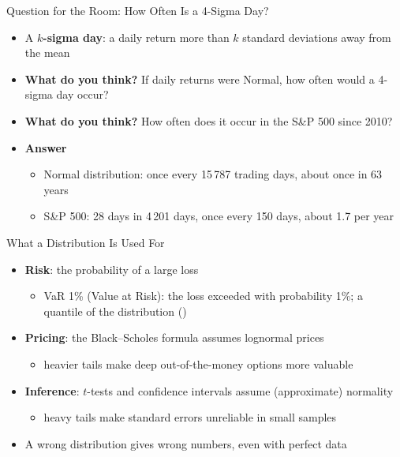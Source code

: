 \begin{frame}{Question for the Room: How Often Is a 4-Sigma Day?}
\itemsize{\small}
\begin{itemize}
    \item A \textbf{$k$-sigma day}: a daily return more than $k$ standard deviations away from the mean
    \item \textbf{What do you think?} If daily returns were Normal, how often would a 4-sigma day occur?
    \item \textbf{What do you think?} How often does it occur in the S\&P 500 since 2010?
    \item \textbf{Answer}
    \begin{itemize}
        \item Normal distribution: once every 15\,787 trading days, about once in 63 years
        \item S\&P 500: 28 days in 4\,201 days, once every 150 days, about 1.7 per year
    \end{itemize}
\end{itemize}
\end{frame}

\begin{frame}{What a Distribution Is Used For}
\itemsize{\small}
\begin{itemize}
    \item \textbf{Risk}: the probability of a large loss
    \begin{itemize}
        \item VaR 1\% (Value at Risk): the loss exceeded with probability 1\%; a quantile of the distribution ()
    \end{itemize}
    \item \textbf{Pricing}: the Black--Scholes formula assumes lognormal prices
    \begin{itemize}
        \item heavier tails make deep out-of-the-money options more valuable
    \end{itemize}
    \item \textbf{Inference}: $t$-tests and confidence intervals assume (approximate) normality
    \begin{itemize}
        \item heavy tails make standard errors unreliable in small samples
    \end{itemize}
    \item A wrong distribution gives wrong numbers, even with perfect data
\end{itemize}
\end{frame}

